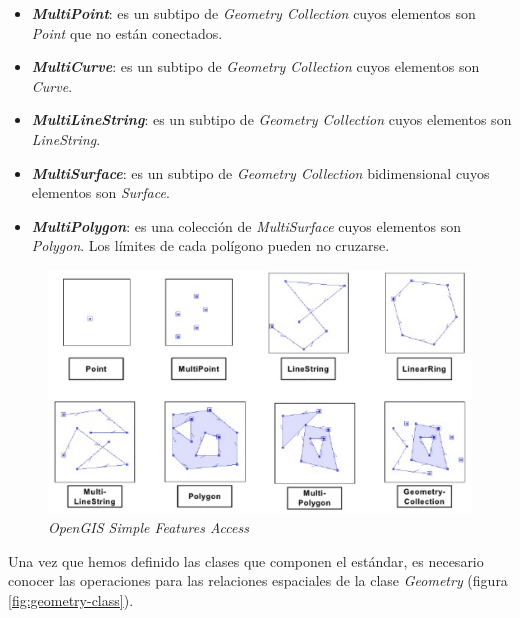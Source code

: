 \begin{itemize}
	\item \textit{\textbf{MultiPoint}}: es un subtipo de \textit{Geometry Collection} cuyos elementos son \textit{Point} que no están conectados.
	
	\item \textit{\textbf{MultiCurve}}: es un subtipo de \textit{Geometry Collection} cuyos elementos son \textit{Curve}.
	
	\item \textit{\textbf{MultiLineString}}: es un subtipo de \textit{Geometry Collection} cuyos elementos son \textit{LineString}. 
	
	\item \textit{\textbf{MultiSurface}}: es un subtipo de \textit{Geometry Collection} bidimensional cuyos elementos son \textit{Surface}.  
	
	\item \textit{\textbf{MultiPolygon}}: es una colección de \textit{MultiSurface} cuyos elementos son \textit{Polygon}. Los límites de cada polígono pueden no cruzarse.
	
\end{itemize}

\begin{figure}[H]
	\centering
	\includegraphics[width=1\linewidth]{imagenes/capitulo4/ejemplos}
	\caption{\textit{OpenGIS Simple Features Access} \cite{imagen-ejemplos}}
	\label{fig:ejemplos}
\end{figure}

Una vez que hemos definido las clases que componen el estándar, es necesario conocer las operaciones para las relaciones espaciales de la clase \textit{Geometry} (figura \ref{fig:geometry-class}).

